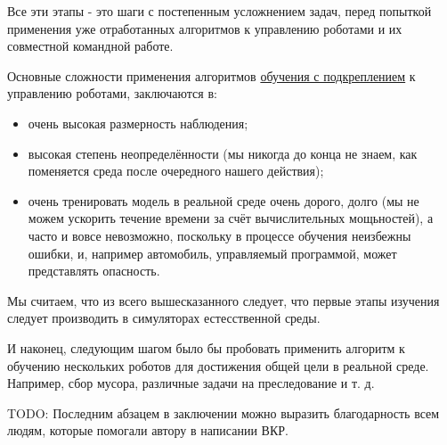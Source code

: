 Все эти этапы - это шаги с постепенным усложнением задач, перед попыткой применения уже отработанных алгоритмов к управлению роботами и их совместной командной работе. 

Основные сложности применения алгоритмов \hyperref[acr:rl]{обучения с подкреплением} к управлению роботами, заключаются в:
\begin{itemize}
	\item очень высокая размерность наблюдения;
	\item высокая степень неопределённости (мы никогда до конца не знаем, как поменяется среда после очередного нашего действия);
	\item очень тренировать модель в реальной среде очень дорого, долго (мы не можем ускорить течение времени за счёт вычислительных мощьностей), а часто и вовсе невозможно, поскольку в процессе обучения неизбежны ошибки, и, например автомобиль, управляемый программой, может представлять опасность.
\end{itemize}

Мы считаем, что из всего вышесказанного следует, что первые этапы изучения следует производить в симуляторах естесственной среды.

И наконец, следующим шагом было бы пробовать применить алгоритм к обучению нескольких роботов для достижения общей цели в реальной среде. Например, сбор мусора, различные задачи на преследование и т. д.

TODO: Последним абзацем в заключении можно выразить благодарность всем людям, которые помогали автору в написании ВКР.